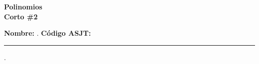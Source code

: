 \begin{center} \textbf
{
    \Large Polinomios \\ \vspace{2mm}Corto \#2
}
\end{center}

\textbf{Nombre:} \hrulefill. \textbf{ Código ASJT:} \rule{2cm}{0.1mm}.
\vspace{-4mm}

